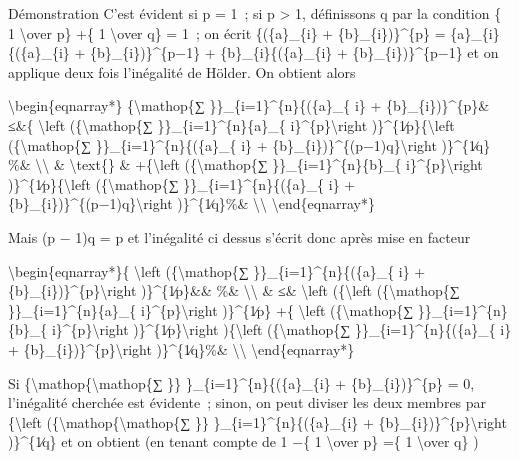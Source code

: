 \documentclass[]{article}
\begin{document}
Démonstration C'est évident si p = 1~; si p \textgreater{} 1,
définissons q par la condition \{ 1 \textbackslash{}over p\} +\{ 1
\textbackslash{}over q\} = 1~; on écrit \{(\{a\}\_\{i\} +
\{b\}\_\{i\})\}\^{}\{p\} = \{a\}\_\{i\}\{(\{a\}\_\{i\} +
\{b\}\_\{i\})\}\^{}\{p−1\} + \{b\}\_\{i\}\{(\{a\}\_\{i\} +
\{b\}\_\{i\})\}\^{}\{p−1\} et on applique deux fois l'inégalité de
Hölder. On obtient alors

\textbackslash{}begin\{eqnarray*\} \{\textbackslash{}mathop\{∑
\}\}\_\{i=1\}\^{}\{n\}\{(\{a\}\_\{ i\} + \{b\}\_\{i\})\}\^{}\{p\}\&
≤\&\{ \textbackslash{}left (\{\textbackslash{}mathop\{∑
\}\}\_\{i=1\}\^{}\{n\}\{a\}\_\{ i\}\^{}\{p\}\textbackslash{}right
)\}\^{}\{1∕p\}\{\textbackslash{}left (\{\textbackslash{}mathop\{∑
\}\}\_\{i=1\}\^{}\{n\}\{(\{a\}\_\{ i\} +
\{b\}\_\{i\})\}\^{}\{(p−1)q\}\textbackslash{}right )\}\^{}\{1∕q\} \%\&
\textbackslash{}\textbackslash{} \& \textbackslash{}text\{\} \&
+\{\textbackslash{}left (\{\textbackslash{}mathop\{∑
\}\}\_\{i=1\}\^{}\{n\}\{b\}\_\{ i\}\^{}\{p\}\textbackslash{}right
)\}\^{}\{1∕p\}\{\textbackslash{}left (\{\textbackslash{}mathop\{∑
\}\}\_\{i=1\}\^{}\{n\}\{(\{a\}\_\{ i\} +
\{b\}\_\{i\})\}\^{}\{(p−1)q\}\textbackslash{}right )\}\^{}\{1∕q\}\%\&
\textbackslash{}\textbackslash{} \textbackslash{}end\{eqnarray*\}

Mais (p − 1)q = p et l'inégalité ci dessus s'écrit donc après mise en
facteur

\textbackslash{}begin\{eqnarray*\}\{ \textbackslash{}left
(\{\textbackslash{}mathop\{∑ \}\}\_\{i=1\}\^{}\{n\}\{(\{a\}\_\{ i\} +
\{b\}\_\{i\})\}\^{}\{p\}\textbackslash{}right )\}\^{}\{1∕p\}\&\& \%\&
\textbackslash{}\textbackslash{} \& ≤\& \textbackslash{}left
(\{\textbackslash{}left (\{\textbackslash{}mathop\{∑
\}\}\_\{i=1\}\^{}\{n\}\{a\}\_\{ i\}\^{}\{p\}\textbackslash{}right
)\}\^{}\{1∕p\} +\{ \textbackslash{}left (\{\textbackslash{}mathop\{∑
\}\}\_\{i=1\}\^{}\{n\}\{b\}\_\{ i\}\^{}\{p\}\textbackslash{}right
)\}\^{}\{1∕p\}\textbackslash{}right )\{\textbackslash{}left
(\{\textbackslash{}mathop\{∑ \}\}\_\{i=1\}\^{}\{n\}\{(\{a\}\_\{ i\} +
\{b\}\_\{i\})\}\^{}\{p\}\textbackslash{}right )\}\^{}\{1∕q\}\%\&
\textbackslash{}\textbackslash{} \textbackslash{}end\{eqnarray*\}

Si \{\textbackslash{}mathop\{\textbackslash{}mathop\{∑ \}\}
\}\_\{i=1\}\^{}\{n\}\{(\{a\}\_\{i\} + \{b\}\_\{i\})\}\^{}\{p\} = 0,
l'inégalité cherchée est évidente~; sinon, on peut diviser les deux
membres par \{\textbackslash{}left
(\{\textbackslash{}mathop\{\textbackslash{}mathop\{∑ \}\}
\}\_\{i=1\}\^{}\{n\}\{(\{a\}\_\{i\} +
\{b\}\_\{i\})\}\^{}\{p\}\textbackslash{}right )\}\^{}\{1∕q\} et on
obtient (en tenant compte de 1 −\{ 1 \textbackslash{}over p\} =\{ 1
\textbackslash{}over q\} )
\end{document}
